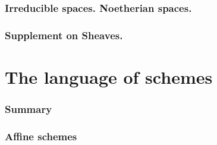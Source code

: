 \documentclass[10pt,oneside]{amsart}
\begin{document}
        

        

    \section{Irreducible spaces. Noetherian spaces.}

        

        

    \section{Supplement on Sheaves.}

        

        

        

        

        

        

        

        



\clearpage


\setcounter{subsection}{0}
\part{The language of schemes}
    
    \section*{Summary}
    

    \section{Affine schemes}
       
        
       
\end{document}
